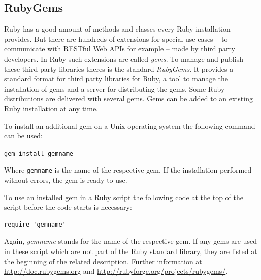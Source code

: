 \subsection{RubyGems}
Ruby has a good amount of methods and classes every Ruby installation provides. But there are hundreds of extensions for special use cases – to communicate with RESTful Web APIs for example – made by third party developers. In Ruby such extensions are called \emph{gems}. To manage and publish these third party libraries theres is the standard \emph{RubyGems}. It provides a standard format for third party libraries for Ruby, a tool to manage the installation of gems and a server for distributing the gems. \cite{ruby:gemdev} Some Ruby distributions are delivered with several gems. Gems can be added to an existing Ruby installation at any time. 

To install an additional gem on a Unix operating system the following command can be used:  
\begin{center}
\texttt{gem install gemname}
\end{center}
Where \texttt{gemname} is the name of the respective gem. If the installation performed without errors, the gem is ready to use. \cite{ruby:gemdoc}

To use an installed gem in a Ruby script the following code at the top of the script before the code starts is necessary:

\begin{lstlisting}[aboveskip=1\baselineskip, caption=Using the gem \emph{gemname}, label=listing001]
require 'gemname'
\end{lstlisting}
Again, \emph{gemname} stands for the name of the respective gem. If any gems are used in these script which are not part of the Ruby standard library, they are listed at the beginning of the related description. Further information at \url{http://doc.rubygems.org} and \url{http://rubyforge.org/projects/rubygems/}.


